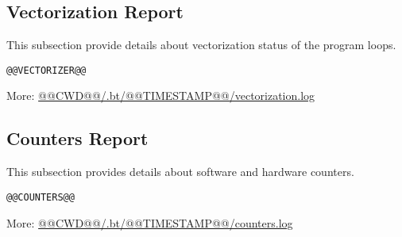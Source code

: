 \documentclass[a4paper]{article}
\begin{document}
\subsection{Vectorization Report}

This subsection provide details about vectorization status of the program loops.

\begin{verbatim}
@@VECTORIZER@@
\end{verbatim}

More: \url{@@CWD@@/.bt/@@TIMESTAMP@@/vectorization.log}

\subsection{Counters Report}

This subsection provides details about software and hardware counters.

\begin{verbatim}
@@COUNTERS@@
\end{verbatim}

More: \url{@@CWD@@/.bt/@@TIMESTAMP@@/counters.log}
\end{document}
